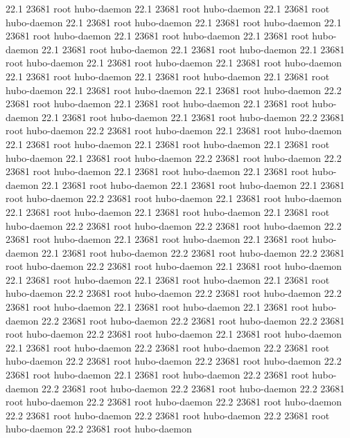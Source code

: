 22.1 23681 root     hubo-daemon
22.1 23681 root     hubo-daemon
22.1 23681 root     hubo-daemon
22.1 23681 root     hubo-daemon
22.1 23681 root     hubo-daemon
22.1 23681 root     hubo-daemon
22.1 23681 root     hubo-daemon
22.1 23681 root     hubo-daemon
22.1 23681 root     hubo-daemon
22.1 23681 root     hubo-daemon
22.1 23681 root     hubo-daemon
22.1 23681 root     hubo-daemon
22.1 23681 root     hubo-daemon
22.1 23681 root     hubo-daemon
22.1 23681 root     hubo-daemon
22.1 23681 root     hubo-daemon
22.1 23681 root     hubo-daemon
22.1 23681 root     hubo-daemon
22.2 23681 root     hubo-daemon
22.1 23681 root     hubo-daemon
22.1 23681 root     hubo-daemon
22.1 23681 root     hubo-daemon
22.1 23681 root     hubo-daemon
22.2 23681 root     hubo-daemon
22.2 23681 root     hubo-daemon
22.1 23681 root     hubo-daemon
22.1 23681 root     hubo-daemon
22.1 23681 root     hubo-daemon
22.1 23681 root     hubo-daemon
22.1 23681 root     hubo-daemon
22.2 23681 root     hubo-daemon
22.2 23681 root     hubo-daemon
22.1 23681 root     hubo-daemon
22.1 23681 root     hubo-daemon
22.1 23681 root     hubo-daemon
22.1 23681 root     hubo-daemon
22.1 23681 root     hubo-daemon
22.2 23681 root     hubo-daemon
22.1 23681 root     hubo-daemon
22.1 23681 root     hubo-daemon
22.1 23681 root     hubo-daemon
22.1 23681 root     hubo-daemon
22.2 23681 root     hubo-daemon
22.2 23681 root     hubo-daemon
22.2 23681 root     hubo-daemon
22.1 23681 root     hubo-daemon
22.1 23681 root     hubo-daemon
22.1 23681 root     hubo-daemon
22.2 23681 root     hubo-daemon
22.2 23681 root     hubo-daemon
22.2 23681 root     hubo-daemon
22.1 23681 root     hubo-daemon
22.1 23681 root     hubo-daemon
22.1 23681 root     hubo-daemon
22.1 23681 root     hubo-daemon
22.2 23681 root     hubo-daemon
22.2 23681 root     hubo-daemon
22.2 23681 root     hubo-daemon
22.1 23681 root     hubo-daemon
22.1 23681 root     hubo-daemon
22.2 23681 root     hubo-daemon
22.2 23681 root     hubo-daemon
22.2 23681 root     hubo-daemon
22.2 23681 root     hubo-daemon
22.1 23681 root     hubo-daemon
22.1 23681 root     hubo-daemon
22.2 23681 root     hubo-daemon
22.2 23681 root     hubo-daemon
22.2 23681 root     hubo-daemon
22.2 23681 root     hubo-daemon
22.2 23681 root     hubo-daemon
22.1 23681 root     hubo-daemon
22.2 23681 root     hubo-daemon
22.2 23681 root     hubo-daemon
22.2 23681 root     hubo-daemon
22.2 23681 root     hubo-daemon
22.2 23681 root     hubo-daemon
22.2 23681 root     hubo-daemon
22.2 23681 root     hubo-daemon
22.2 23681 root     hubo-daemon
22.2 23681 root     hubo-daemon
22.2 23681 root     hubo-daemon
